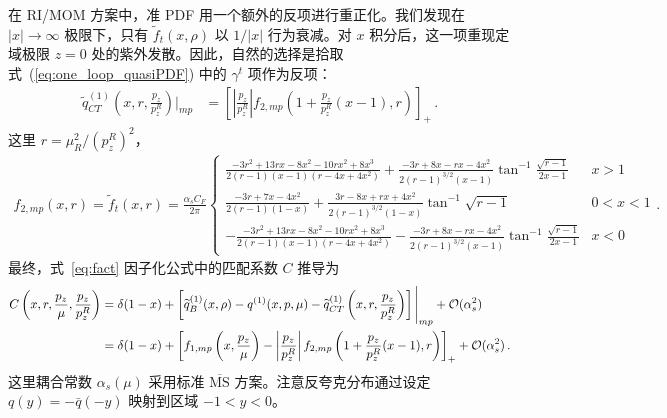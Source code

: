 在 RI/MOM 方案中，准 PDF 用一个额外的反项进行重正化。我们发现在 $|x|\to\infty$ 极限下，只有 $\widetilde{f}_t(x,\rho)$ 以 $1/|x|$ 行为衰减。对 $x$ 积分后，这一项重现定域极限 $z=0$ 处的紫外发散。因此，自然的选择是拾取式~(\ref{eq:one_loop_quasiPDF}) 中的 $\gamma^t$ 项作为反项：
\begin{align}
\widetilde{q}_{CT}^{(1)}\left(x,r,\frac{p_z}{p_z^R}\right)\bigg|_{mp}&=\left[\left|\frac{p_z}{p_z^R}\right|f_{2,mp}\left(1+\frac{p_z}{p_z^R}(x-1),r\right)\right]_+\,.
\end{align}
这里 $r=\mu_R^2/(p_z^R)^2$，
\begin{align}
f_{2,mp}(x,r)=\widetilde{f}_t(x,r)=\frac{\alpha_s C_F}{2\pi}\left\{
\begin{array}{lc}
\frac{-3r^2+13rx-8x^2-10rx^2+8x^3}{2(r-1)(x-1)(r-4x+4x^2)}+\frac{-3r+8x-rx-4x^2}{2(r-1)^{3/2}(x-1)}\tan^{-1}\frac{\sqrt{r-1}}{2x-1} & x>1\\
\frac{-3r+7x-4x^2}{2(r-1)(1-x)}+\frac{3r-8x+rx+4x^2}{2(r-1)^{3/2}(1-x)}\tan^{-1}\sqrt{r-1} & 0<x<1\\
-\frac{-3r^2+13rx-8x^2-10rx^2+8x^3}{2(r-1)(x-1)(r-4x+4x^2)}-\frac{-3r+8x-rx-4x^2}{2(r-1)^{3/2}(x-1)}\tan^{-1}\frac{\sqrt{r-1}}{2x-1} & x<0
\end{array} \right. .
\end{align}
最终，式~\eqref{eq:fact} 因子化公式中的匹配系数 $C$ 推导为
\begin{align}\label{eq:matching_coeff}
C\left(x,r,\frac{p_z}{\mu},\frac{p_z}{p_z^R}\right)&=\delta(1-x)+\left[\widetilde{q}^{(1)}_B(x,\rho)-q^{(1)}(x,p,\mu)-\widetilde{q}_{CT}^{(1)}\left(x,r,\frac{p_z}{p_z^R}\right)\right]\Bigg|_{mp}+{\cal O}(\alpha_s^2)\nonumber\\
&=\delta(1-x)+\left[f_{1,mp}\left(x,\frac{p_z}{\mu}\right)-\left|\frac{p_z}{p_z^R}\right|f_{2,mp}\left(1+\frac{p_z}{p_z^R}(x-1),r\right)\right]_+ +{\cal O}(\alpha_s^2)\,.
\end{align}
这里耦合常数 $\alpha_s(\mu)$ 采用标准 $\overline{\text{MS}}$ 方案。注意反夸克分布通过设定 $q(y)=-\bar{q}(-y)$ 映射到区域 $-1<y<0$。

